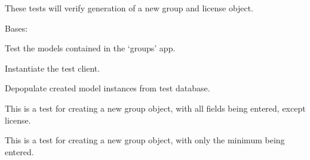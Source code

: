 \documentclass[letterpaper,10pt,english]{sphinxmanual}
\begin{document}
\begin{fulllineitems}
These tests will verify generation of a new group and license object.

\begin{fulllineitems}
\label{api:groups.tests.GroupsModelTests}
Bases: 

Test the models contained in the `groups' app.

\begin{fulllineitems}
\label{api:groups.tests.GroupsModelTests.setUp}
Instantiate the test client.

\end{fulllineitems}


\begin{fulllineitems}
\label{api:groups.tests.GroupsModelTests.tearDown}
Depopulate created model instances from test database.

\end{fulllineitems}


\begin{fulllineitems}
\label{api:groups.tests.GroupsModelTests.test_create_group_all_fields}
This is a test for creating a new group object, with all fields being entered, except license.

\end{fulllineitems}


\begin{fulllineitems}
\label{api:groups.tests.GroupsModelTests.test_create_group_minimal}
This is a test for creating a new group object, with only the minimum being entered.

\end{fulllineitems}



\end{fulllineitems}
\end{fulllineitems}
\end{document}
